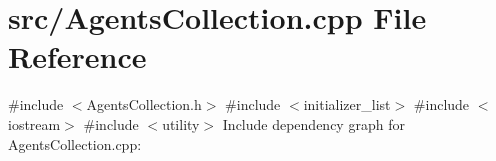 \section{src/\+Agents\+Collection.cpp File Reference}
\label{_agents_collection_8cpp}
{\ttfamily \#include $<$Agents\+Collection.\+h$>$}\newline
{\ttfamily \#include $<$initializer\+\_\+list$>$}\newline
{\ttfamily \#include $<$iostream$>$}\newline
{\ttfamily \#include $<$utility$>$}\newline
Include dependency graph for Agents\+Collection.\+cpp\+:
